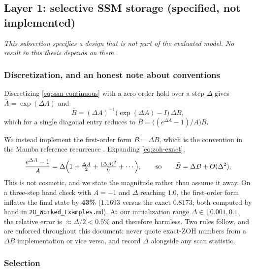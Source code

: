\documentclass[11pt,a4paper]{article}
\newcommand{\Atr}{\bar{A}}
\newcommand{\Btr}{\bar{B}}
\theoremstyle{plain}
\theoremstyle{definition}
\theoremstyle{remark}
\begin{document}
\subsection{Layer 1: selective SSM storage (specified, not implemented)}

\noindent
\emph{This subsection specifies a design that is not
part of the evaluated model. No result in this thesis depends on them.}


\subsubsection{Discretization, and an honest note about conventions}
\label{sec:discretization}

\noindent
Discretizing \eqref{eq:ssm-continuous} with a zero-order hold over a step
$\Delta$ gives $\Atr = \exp(\Delta A)$ and
\begin{equation}
  \Btr = (\Delta A)^{-1}\bigl(\exp(\Delta A) - I\bigr)\, \Delta B,
  \label{eq:zoh-exact}
\end{equation}
which for a single diagonal entry reduces to
$\Btr = \bigl((e^{\Delta A} - 1)/A\bigr) B$.

\noindent
We instead implement the first-order form $\Btr = \Delta B$, which is the
convention in the Mamba reference recurrence \cite{gu2023mamba}. Expanding
\eqref{eq:zoh-exact},
\begin{equation}
  \frac{e^{\Delta A} - 1}{A} = \Delta\Bigl(1 + \tfrac{\Delta A}{2} + \tfrac{(\Delta A)^2}{6} + \cdots\Bigr),
  \qquad \text{so} \qquad \Btr = \Delta B + O(\Delta^2).
  \label{eq:zoh-expansion}
\end{equation}
This is not cosmetic, and we state the magnitude rather than assume it away.
On a three-step hand check with $A = -1$ and $\Delta$ reaching $1.0$, the
first-order form inflates the final state by \textbf{43\%}
($1.1693$ versus the exact $0.8173$; both computed by hand in
\texttt{28\_Worked\_Examples.md}). At our initialization range
$\Delta \in [0.001, 0.1]$ the relative error is
$\approx \Delta/2 < 0.5\%$ and therefore harmless. Two rules follow, and are
enforced throughout this document: never quote exact-ZOH numbers from a
$\Delta B$ implementation or vice versa, and record $\Delta$ alongside any
scan statistic.

\subsubsection{Selection}
\end{document}
